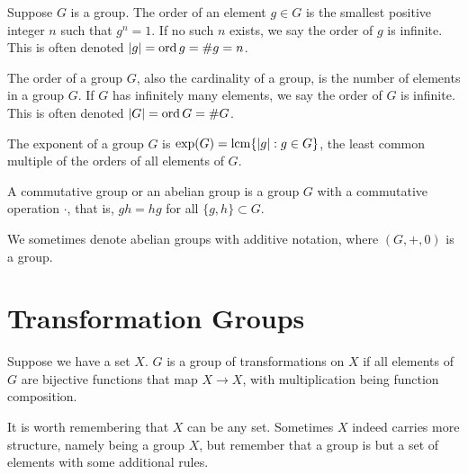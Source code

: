 \begin{definition}
    Suppose \(G\) is a group.
    The order of an element \(g \in G\)
    is the smallest positive integer \(n\)
    such that \(g^n = 1\).
    If no such \(n\) exists,
    we say the order of \(g\) is infinite.
    This is often denoted \(\abs{g} = \operatorname{ord}{g} = \#g = n\).
\end{definition}
\begin{definition}
    The order of a group \(G\),
    also the cardinality of a group,
    is the number of elements in a group \(G\).
    If \(G\) has infinitely many elements,
    we say the order of \(G\) is infinite.
    This is often denoted \(\abs{G} = \operatorname{ord}{G} = \#G\).
\end{definition}
\begin{definition}
    The exponent of a group \(G\)
    is \(\exp(G) = \operatorname{lcm}\{\abs{g}: g \in G\}\),
    the least common multiple of the orders of all elements of \(G\).
\end{definition}

\begin{definition}
    A commutative group or an abelian group
    is a group \(G\) with a commutative operation \(\cdot\),
    that is, \(gh = hg\) for all \(\{g,h\} \subset G\).
\end{definition}
\begin{remark}
    We sometimes denote abelian groups with additive notation,
    where \((G,+,0)\) is a group.
\end{remark}


\section{Transformation Groups}

\begin{definition}
    Suppose we have a set \(X\).
    \(G\) is a group of transformations on \(X\)
    if all elements of \(G\) are bijective functions that map \(X \to X\),
    with multiplication being function composition.
\end{definition}
\begin{remark}
    It is worth remembering that \(X\) can be any set.
    Sometimes \(X\) indeed carries more structure,
    namely being a group \(X\),
    but remember that a group is but a set of elements
    with some additional rules.
\end{remark}


